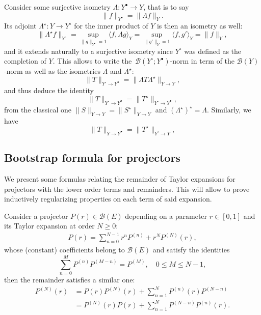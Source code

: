\documentclass[AHL,Unicode,longabstracts,published]{cedram}
\newcommand{\BBB}{\mathscr{B}}
\newcommand{\Sg}{Y}
\newcommand{\Sgp}{Y^{\bullet}}
\newcommand{\Sgm}{Y^{\circ}}
\renewcommand*\le{\leqslant}
\renewcommand*\ge{\geqslant}
\newcommand{\la}{\langle}
\newcommand{\ra}{\rangle}
\begin{document}
Consider some surjective isometry $\Lambda : \Sgp \to \Sg$, that is to say
\[
\| f \|_{\Sgp} = \| \Lambda f \|_{\Sg}.
\]
Its adjoint $\Lambda^\star : \Sg \to \Sgm$ for the inner product of $\Sg$ is then an isometry as well:
\begin{equation*}
\| \Lambda^\star f \|_{\Sgm} = \sup_{\| g \|_{\Sgp} = 1} \la f, \Lambda g \ra_{\Sg} = \sup_{\| g' \|_{\Sg} = 1} \la f, g' \ra_{\Sg} = \| f \|_{\Sg},
\end{equation*}
and it extends naturally to a surjective isometry since $\Sgm$ was defined as the completion of $\Sg$. This allows to write the~$\BBB(\Sgm ; \Sgp)$-norm in term of the $\BBB(\Sg)$-norm as well as the isometries $\Lambda$ and $\Lambda^\star$:
\[
\| T \|_{ \Sgm \to \Sgp } = \| \Lambda T \Lambda^\star \|_{ \Sg \to \Sg},
\]
and thus deduce the identity
\begin{equation}\label{eq:twisted_adjoint_identity}
\| T \|_{ \Sgm \to \Sgp } = \| T^\star \|_{ \Sgm \to \Sgp },
\end{equation}
from the classical one $\| S \|_{\Sg \to \Sg} = \| S^\star \|_{\Sg \to \Sg}$ and $(\Lambda^\star)^\star=\Lambda$. Similarly, we have
\begin{equation}\label{eq:twisted_adjoint_identity_one_sided}
\| T \|_{\Sg \to \Sgp } = \| T^\star \|_{ \Sgm \to \Sg },
\end{equation}


\subsection{Bootstrap formula for projectors}\label{scn:boostrap_projectors}

We present some formulas relating the remainder of Taylor expansions for projectors with the lower order terms and remainders. This will allow to prove inductively regularizing properties on each term of said expansion.

\begin{lemm}
Consider a projector $P(r) \in \BBB(E)$ depending on a parameter $r \in [0, 1]$ and its Taylor expansion at order $N \ge 0$:
\begin{gather*}
P(r) = \sum_{n=0}^{N-1} r^n P^{(n)} + r^N P^{(N)}(r),
\end{gather*}
whose (constant) coefficients belong to $\BBB(E)$ and satisfy the identities
\begin{equation}\label{eq:convolution_polynom_projector}
\sum_{n=0}^{M} P^{(n)} P^{(M-n)} =P^{(M)}, \quad 0 \le M \le N-1,
\end{equation}
then the remainder satisfies a similar one:
\begin{align}
P^{(N)}(r) & = P(r) P^{(N)}(r) + \sum_{n=1}^{N} P^{(n)} (r) P^{(N-n)}\label{eq:bootstrap_P_N_A} \\
& = P^{(N)}(r) P(r) + \sum_{n=1}^{N} P^{(N-n)} P^{(n)} (r).
\label{eq:bootstrap_P_N_B}
\end{align}
\end{lemm}
\end{document}
